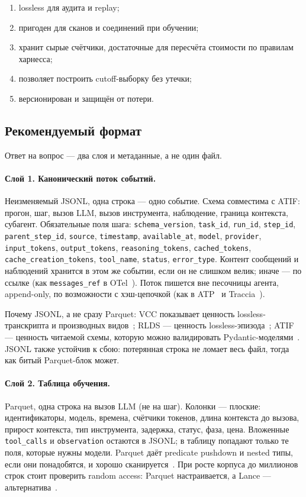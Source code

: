 \documentclass[11pt,a4paper]{article}
\begin{document}
\begin{enumerate}
  \item lossless для аудита и replay;
  \item пригоден для сканов и соединений при обучении;
  \item хранит сырые счётчики, достаточные для пересчёта стоимости по
        правилам харнесса;
  \item позволяет построить cutoff-выборку без утечки;
  \item версионирован и защищён от потери.
\end{enumerate}

\subsection{Рекомендуемый формат}

Ответ на вопрос — два слоя и метаданные, а не один файл.

\paragraph{Слой 1. Канонический поток событий.}
Неизменяемый JSONL, одна строка — одно событие. Схема совместима с ATIF:
прогон, шаг, вызов LLM, вызов инструмента, наблюдение, граница контекста,
субагент. Обязательные поля шага: \texttt{schema\_version},
\texttt{task\_id}, \texttt{run\_id}, \texttt{step\_id},
\texttt{parent\_step\_id}, \texttt{source}, \texttt{timestamp},
\texttt{available\_at}, \texttt{model}, \texttt{provider},
\texttt{input\_tokens}, \texttt{output\_tokens},
\texttt{reasoning\_tokens}, \texttt{cached\_tokens},
\texttt{cache\_creation\_tokens}, \texttt{tool\_name},
\texttt{status}, \texttt{error\_type}. Контент сообщений и наблюдений
хранится в этом же событии, если он не слишком велик; иначе — по ссылке
(как \texttt{messages\_ref} в OTel~\cite{otel2026genai}). Поток пишется
вне песочницы агента, append-only, по возможности с хэш-цепочкой
(как в ATP~\cite{he2026atp} и Traccia~\cite{naik2026traccia}).

Почему JSONL, а не сразу Parquet: VCC показывает ценность lossless-
транскрипта и производных видов~\cite{zhang2026vcc}; RLDS — ценность
lossless-эпизода~\cite{ramos2021rlds}; ATIF — ценность читаемой схемы,
которую можно валидировать Pydantic-моделями~\cite{atif2026}. JSONL также
устойчив к сбою: потерянная строка не ломает весь файл, тогда как
битый Parquet-блок может.

\paragraph{Слой 2. Таблица обучения.}
Parquet, одна строка на вызов LLM (не на шаг). Колонки — плоские:
идентификаторы, модель, времена, счётчики токенов, длина контекста до
вызова, прирост контекста, тип инструмента, задержка, статус, фаза,
цена. Вложенные \texttt{tool\_calls} и \texttt{observation} остаются в
JSONL; в таблицу попадают только те поля, которые нужны модели. Parquet
даёт predicate pushdown и nested типы, если они понадобятся, и хорошо
сканируется~\cite{lang2025parquetdb,zeng2023columnar}. При росте корпуса
до миллионов строк стоит проверить random access: Parquet настраивается,
а Lance — альтернатива~\cite{pace2025lance}.
\end{document}
